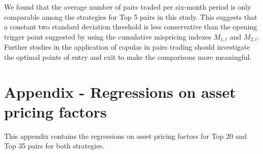 \documentclass[a4paper]{article}
\begin{document}
\vspace{0.3cm}

We found that the average number of pairs traded per six-month period is only comparable among the strategies for Top 5 pairs in this study. This suggests that a constant two standard deviation threshold \citep{ggr06} is less conservative than the opening trigger point suggested by \citet*{rf15} using the cumulative mispricing indexes $M_{1,t}$ and $M_{2,t}$. Further studies in the application of copulas in pairs trading should investigate the optimal points of entry and exit to make the comparisons more meaningful.


	\newpage
	
	\section*{Appendix - Regressions on asset pricing factors}
	
	\vspace{0.6cm}
	
	\setcounter{table}{0}
	\renewcommand{\thetable}{A.\arabic{table}}
	
	
	This appendix contains the regressions on asset pricing factors for Top 20 and Top 35 pairs for both strategies.
	
	\vspace{1.0cm}
	
\end{document}
